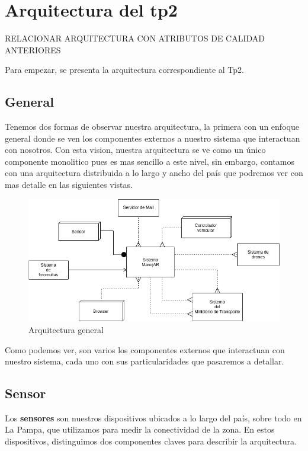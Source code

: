 \section{Arquitectura del tp2}


RELACIONAR ARQUITECTURA CON ATRIBUTOS DE CALIDAD ANTERIORES

Para empezar, se presenta la arquitectura correspondiente al Tp2.\newline

\subsection{General}

Tenemos dos formas de observar nuestra arquitectura, la primera con un enfoque general donde se ven
los componentes externos a nuestro sistema que interactuan con nosotros. Con 
esta vision, nuestra arquitectura se ve como un único componente monolitico pues es mas sencillo a
este nivel, sin embargo, contamos con una arquitectura distribuida a lo largo y ancho del país 
que podremos ver con mas detalle en las siguientes vistas.

\begin{figure}
\centerline{\includegraphics[width=1\textwidth]{./imagenes/arquitectura_tp2/general.png}}
\caption{Arquitectura general}
\end{figure}

Como podemos ver, son varios los componentes externos que interactuan con 
nuestro sistema, cada uno con sus particularidades que pasaremos a detallar.

\subsection{Sensor}
Los \textbf{sensores} son nuestros dispositivos ubicados a lo largo del país, sobre todo en La 
Pampa, que utilizamos para medir la conectividad de la zona.
En estos dispositivos, distinguimos dos componentes claves para describir la 
arquitectura.

